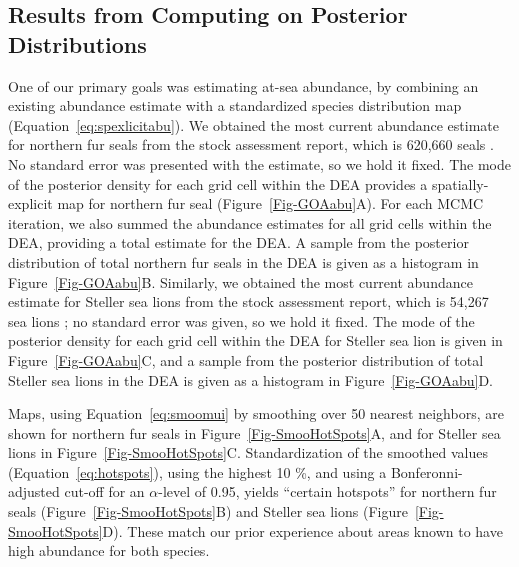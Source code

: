 \documentclass[11pt, titlepage]{article}
\begin{document}
\begin{spacing}{1.9}
\begin{flushleft}

\subsection{Results from Computing on Posterior Distributions}

One of our primary goals was estimating at-sea abundance, by combining an existing abundance estimate with a standardized species distribution map (Equation~\ref{eq:spexlicitabu}).  We obtained the most current abundance estimate for northern fur seals from the stock assessment report, which is 620,660 seals \citep{muto_alaska_2019}.  No standard error was presented with the estimate, so we hold it fixed. The mode of the posterior density for each grid cell within the DEA provides a spatially-explicit map for northern fur seal (Figure~\ref{Fig-GOAabu}A). For each MCMC iteration, we also summed the abundance estimates for all grid cells within the DEA, providing a total estimate for the DEA. A sample from the posterior distribution of total northern fur seals in the DEA is given as a histogram in Figure~\ref{Fig-GOAabu}B.  Similarly, we obtained the most current abundance estimate for Steller sea lions from the stock assessment report, which is 54,267 sea lions \citep{muto_alaska_2019}; no standard error was given, so we hold it fixed. The mode of the posterior density for each grid cell within the DEA for Steller sea lion is given in Figure~\ref{Fig-GOAabu}C, and a sample from the posterior distribution of total Steller sea lions in the DEA is given as a histogram in Figure~\ref{Fig-GOAabu}D.

Maps, using Equation~\eqref{eq:smoomui} by smoothing over 50 nearest neighbors, are shown for northern fur seals in Figure~\ref{Fig-SmooHotSpots}A, and for Steller sea lions in Figure~\ref{Fig-SmooHotSpots}C.  Standardization of the smoothed values (Equation~\ref{eq:hotspots}), using the highest 10 \%, and using a Bonferonni-adjusted cut-off for an $\alpha$-level of 0.95, yields ``certain hotspots'' for northern fur seals (Figure~\ref{Fig-SmooHotSpots}B) and Steller sea lions (Figure~\ref{Fig-SmooHotSpots}D).  These match our prior experience about areas known to have high abundance for both species.



\end{flushleft}
\end{spacing}
\end{document}
